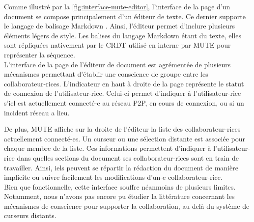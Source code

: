 \label{sec:mute-interface-utilisateur}

Comme illustré par la \autoref{fig:interface-mute-editor}, l'interface de la page d'un document se compose principalement d'un éditeur de texte.
Ce dernier supporte le langage de balisage Markdown \cite{2004-markdown}.
Ainsi, l'éditeur permet d'inclure plusieurs éléments légers de style.
Les balises du langage Markdown étant du texte, elles sont répliquées nativement par le \ac{CRDT} utilisé en interne par \ac{MUTE} pour représenter la séquence.\\

L'interface de la page de l'éditeur de document est agrémentée de plusieurs mécanismes permettant d'établir une conscience de groupe entre les collaborateur-rices.
L'indicateur en haut à droite de la page représente le statut de connexion de l'utilisateur-rice.
Celui-ci permet d'indiquer à l'utilisateur-rice s'iel est actuellement connecté-e au réseau \ac{P2P}, en cours de connexion, ou si un incident réseau a lieu.

De plus, \ac{MUTE} affiche sur la droite de l'éditeur la liste des collaborateur-rices actuellement connecté-es.
Un curseur ou une sélection distante est associée pour chaque membre de la liste.
Ces informations permettent d'indiquer à l'utilisateur-rice dans quelles sections du document ses collaborateur-rices sont en train de travailler.
Ainsi, iels peuvent se répartir la rédaction du document de manière implicite ou suivre facilement les modifications d'un-e collaborateur-rice.\\

Bien que fonctionnelle, cette interface souffre néanmoins de plusieurs limites.
Notamment, nous n'avons pas encore pu étudier la littérature concernant les mécanismes de conscience pour supporter la collaboration, au-delà du système de curseurs distants.

